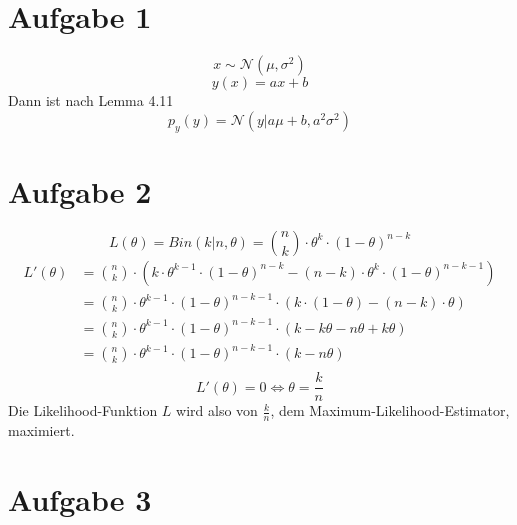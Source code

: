 \documentclass[10pt,a4paper]{article}
\begin{document}
\section{Aufgabe 1}

\begin{equation}
  x \sim \mathcal{N}(\mu, \sigma^{2})
\end{equation}
\begin{equation}
  y(x) = ax + b
\end{equation}
Dann ist nach Lemma 4.11
\begin{equation}
  p_{y}(y) = \mathcal{N}(y | a\mu + b, a^{2}\sigma^{2})
\end{equation}

\section{Aufgabe 2}

\begin{equation}
  L(\theta) = Bin(k | n, \theta) = \binom{n}{k} \cdot \theta^{k} \cdot (1 - \theta)^{n - k}
\end{equation}
\begin{align*}
  L'(\theta) & = \binom{n}{k} \cdot \left( k \cdot \theta^{k - 1} \cdot (1 - \theta)^{n - k} - (n - k) \cdot \theta^{k} \cdot (1 - \theta)^{n - k - 1} \right)\\
  & = \binom{n}{k} \cdot \theta^{k - 1} \cdot (1 - \theta)^{n - k - 1} \cdot \left( k \cdot (1 - \theta) - (n - k) \cdot \theta \right)\\
  & = \binom{n}{k} \cdot \theta^{k - 1} \cdot (1 - \theta)^{n - k - 1} \cdot \left( k - k\theta - n\theta + k\theta \right)\\
  & = \binom{n}{k} \cdot \theta^{k - 1} \cdot (1 - \theta)^{n - k - 1} \cdot \left( k - n\theta \right)\\
\end{align*}
\begin{equation}
  L'(\theta) = 0 \Leftrightarrow \theta = \frac{k}{n}
\end{equation}
Die Likelihood-Funktion $L$ wird also von $\frac{k}{n}$, dem
Maximum-Likelihood-Estimator, maximiert.

\section{Aufgabe 3}
\end{document}
